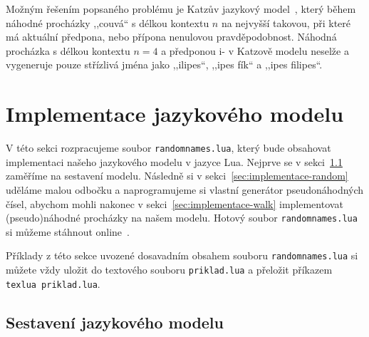 \documentclass{csbulletin}
\newcommand\vref[1]{\ref{#1} na straně~\pageref{#1}}
\let\vref=\ref
\begin{document}
Možným řešením popsaného problému je Katzův jazykový model~\cite{katz1987estimation}, který během náhodné procházky ,,couvá`` s délkou kontextu $n$ na nejvyšší takovou, při které má aktuální předpona, nebo přípona nenulovou pravděpodobnost. Náhodná procházka s délkou kontextu $n=4$ a předponou i- v Katzově modelu neselže a vygeneruje pouze střízlivá jména jako ,,ilipes``, ,,ipes fík`` a ,,ipes filipes``.

\section{Implementace jazykového modelu}
\label{sec:implementace}

V této sekci rozpracujeme soubor \texttt{randomnames.lua}, který bude obsahovat implementaci našeho jazykového modelu v jazyce Lua. Nejprve se v sekci~\ref{sec:implementace-model} zaměříme na sestavení modelu. Následně si v sekci~\vref{sec:implementace-random} uděláme malou odbočku a naprogramujeme si vlastní generátor pseudonáhodných čísel, abychom mohli nakonec v sekci~\vref{sec:implementace-walk} implementovat (pseudo)náhodné procházky na našem modelu. Hotový soubor \texttt{randomnames.lua} si můžeme stáhnout online~\cite{novotny2023napadovnik}.

Příklady z této sekce uvozené dosavadním obsahem souboru \texttt{randomnames.lua} si můžete vždy uložit do textového souboru \texttt{priklad.lua} a přeložit příkazem \texttt{texlua priklad.lua}.

\subsection{Sestavení jazykového modelu}
\label{sec:implementace-model}
\end{document}
